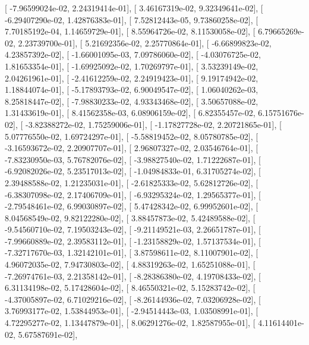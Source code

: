\documentclass{article}
\begin{document}
       [ -7.96599024e-02,   2.24319414e-01],
       [  3.46167319e-02,   9.32349641e-02],
       [ -6.29407290e-02,   1.42876383e-01],
       [  7.52812443e-05,   9.73860258e-02],
       [  7.70185192e-04,   1.14659729e-01],
       [  8.55964726e-02,   8.11530058e-02],
       [  6.79665269e-02,   2.23739700e-01],
       [  5.21692356e-02,   2.25770864e-01],
       [ -6.66899823e-02,   4.23857392e-02],
       [ -1.66001095e-03,   7.09786060e-02],
       [ -4.03076725e-02,   1.81653354e-01],
       [ -1.69925092e-02,   1.70269797e-01],
       [  3.53239149e-02,   2.04261961e-01],
       [ -2.41612259e-02,   2.24919423e-01],
       [  9.19174942e-02,   1.18844074e-01],
       [ -5.17893793e-02,   6.90049547e-02],
       [  1.06040262e-03,   8.25818447e-02],
       [ -7.98830233e-02,   4.93343468e-02],
       [  3.50657088e-02,   1.31433619e-01],
       [  8.41562358e-03,   6.08906159e-02],
       [  6.82355457e-02,   6.15751676e-02],
       [ -3.82388272e-02,   1.75259006e-01],
       [ -1.17827728e-02,   2.20721865e-01],
       [  5.07776550e-02,   1.69724297e-01],
       [ -5.58819452e-02,   8.05780785e-02],
       [ -3.16593672e-02,   2.20907707e-01],
       [  2.96807327e-02,   2.03546764e-01],
       [ -7.83230950e-03,   5.76782076e-02],
       [ -3.98827540e-02,   1.71222687e-01],
       [ -6.92082026e-02,   5.23517013e-02],
       [ -1.04984833e-01,   6.31705274e-02],
       [  2.39488588e-02,   1.21235031e-01],
       [ -2.61825333e-02,   5.62812726e-02],
       [ -6.38307098e-02,   2.17406709e-01],
       [ -6.93295324e-02,   1.29565377e-01],
       [ -2.79548461e-02,   6.99030897e-02],
       [  5.47428342e-02,   6.99952601e-02],
       [  8.04568549e-02,   9.82122280e-02],
       [  3.88457873e-02,   5.42489588e-02],
       [ -9.54560710e-02,   7.19503243e-02],
       [ -9.21149521e-03,   2.26651787e-01],
       [ -7.99660889e-02,   2.39583112e-01],
       [ -1.23158829e-02,   1.57137534e-01],
       [ -7.32717670e-03,   1.32142101e-01],
       [  3.87598611e-02,   8.11007901e-02],
       [  4.96072035e-02,   7.94730803e-02],
       [  4.88319263e-02,   1.65251088e-01],
       [ -7.26974761e-03,   2.21358142e-01],
       [ -8.28386380e-02,   4.19708433e-02],
       [  6.31134198e-02,   5.17428604e-02],
       [  8.46550321e-02,   5.15283742e-02],
       [ -4.37005897e-02,   6.71029216e-02],
       [ -8.26144936e-02,   7.03206928e-02],
       [  3.76993177e-02,   1.53844953e-01],
       [ -2.94514443e-03,   1.03508991e-01],
       [  4.72295277e-02,   1.13447879e-01],
       [  8.06291276e-02,   1.82587955e-01],
       [  4.11614401e-02,   5.67587691e-02],
\end{document}
